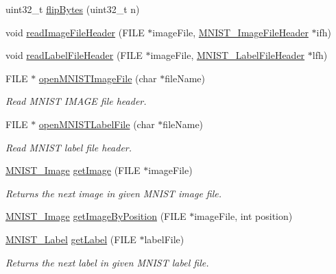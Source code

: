 \begin{DoxyCompactItemize}
\item 
uint32\+\_\+t \hyperlink{mnist-utils_8c_a726f2a67e4165a46d748843d2b6156f9}{flip\+Bytes} (uint32\+\_\+t n)
\item 
void \hyperlink{mnist-utils_8c_a5136ef4142d6fb378b466e94fca8bb82}{read\+Image\+File\+Header} (F\+I\+L\+E $\ast$image\+File, \hyperlink{struct_m_n_i_s_t___image_file_header}{M\+N\+I\+S\+T\+\_\+\+Image\+File\+Header} $\ast$ifh)
\item 
void \hyperlink{mnist-utils_8c_a5128bf9a73a458a9580b81b31c0c0d5c}{read\+Label\+File\+Header} (F\+I\+L\+E $\ast$image\+File, \hyperlink{struct_m_n_i_s_t___label_file_header}{M\+N\+I\+S\+T\+\_\+\+Label\+File\+Header} $\ast$lfh)
\item 
F\+I\+L\+E $\ast$ \hyperlink{mnist-utils_8c_a8a5ef24b830e1a8f15a080db2ab8bb12}{open\+M\+N\+I\+S\+T\+Image\+File} (char $\ast$file\+Name)
\begin{DoxyCompactList}\small\item\em Read M\+N\+I\+S\+T I\+M\+A\+G\+E file header. \end{DoxyCompactList}\item 
F\+I\+L\+E $\ast$ \hyperlink{mnist-utils_8c_a443abebe82519f810aeb2cb226d4bc99}{open\+M\+N\+I\+S\+T\+Label\+File} (char $\ast$file\+Name)
\begin{DoxyCompactList}\small\item\em Read M\+N\+I\+S\+T label file header. \end{DoxyCompactList}\item 
\hyperlink{struct_m_n_i_s_t___image}{M\+N\+I\+S\+T\+\_\+\+Image} \hyperlink{mnist-utils_8c_a0076b10c59220ac7cbf26d0c79b330d0}{get\+Image} (F\+I\+L\+E $\ast$image\+File)
\begin{DoxyCompactList}\small\item\em Returns the next image in given M\+N\+I\+S\+T image file. \end{DoxyCompactList}\item 
\hyperlink{struct_m_n_i_s_t___image}{M\+N\+I\+S\+T\+\_\+\+Image} \hyperlink{mnist-utils_8c_aee2b09d74a09167a2a9e2e502ee417b8}{get\+Image\+By\+Position} (F\+I\+L\+E $\ast$image\+File, int position)
\item 
\hyperlink{mnist-utils_8h_ac563f2337f8e23f2dcc095e41c138bfa}{M\+N\+I\+S\+T\+\_\+\+Label} \hyperlink{mnist-utils_8c_ae38097965d1c8edf5b054aee0adafe0d}{get\+Label} (F\+I\+L\+E $\ast$label\+File)
\begin{DoxyCompactList}\small\item\em Returns the next label in given M\+N\+I\+S\+T label file. \end{DoxyCompactList}\item 

\end{DoxyCompactItemize}
